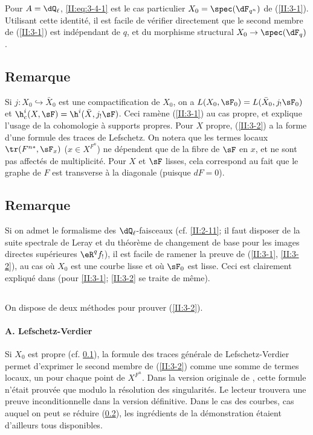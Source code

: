 Pour $A=\dQ_\ell$, \eqref{II:eq:3-4-1} est le cas particulier 
$X_0=\spec(\dF_{q^n})$ de (\ref{II:3-1}). Utilisant cette identité, il est 
facile de vérifier directement que le second membre de (\ref{II:3-1}) est 
indépendant de $q$, et du morphisme structural $X_0\to\spec(\dF_q)$. 





\subsection{Remarque}\label{II:3-6}

Si $j:X_0\hookrightarrow \bar X_0$ est une compactification de $X_0$, on a 
$L(X_0,\sF_0) = L(\bar X_0, j_!\sF_0)$ et 
$\h_c^i(X,\sF) = \h^i(\bar X,j_!\sF)$. Ceci ramène (\ref{II:3-1}) au cas 
propre, et explique l'usage de la cohomologie à supports propres. Pour $X$ 
propre, (\ref{II:3-2}) a la forme d'une formule des traces de Lefschetz. On 
notera que les termes locaux $\tr(F^{n *},\sF_x)$ ($x\in X^{F^n}$) ne 
dépendent que de la fibre de $\sF$ en $x$, et ne sont pas affectés de 
multiplicité. Pour $X$ et $\sF$ lisses, cela correspond au fait que le graphe 
de $F$ est transverse à la diagonale (puisque $d F = 0$). 





\subsection{Remarque}\label{II:3-7}

Si on admet le formalisme des $\dQ_\ell$-faisceaux (cf. \ref{II:2-11}; il faut 
disposer de la suite spectrale de Leray et du théorème de changement de 
base pour les images directes supérieures $\eR^q f_!$), il est facile de 
ramener la preuve de (\ref{II:3-1}, \ref{II:3-2}), au cas où $X_0$ est 
une courbe lisse et où $\sF_0$ est lisse. Ceci est clairement expliqué 
dans \cite[\S 5]{gr95} (pour \ref{II:3-1}; \ref{II:3-2} se traite de même). 





\subsection{}\label{II:3-8}

On dispose de deux méthodes pour prouver (\ref{II:3-2}). 


\paragraph{A. Lefschetz-Verdier}
Si $X_0$ est propre (cf. \ref{II:3-6}), la formule des traces générale de 
Lefschetz-Verdier permet d'exprimer le second membre de (\ref{II:3-2}) comme 
une somme de termes locaux, un pour chaque point de $X^{F^n}$. Dans la version 
originale de \cite{sga5}, cette formule n'était prouvée que modulo la 
résolution des singularités. Le lecteur trouvera une preuve inconditionnelle 
dans la version définitive. Dans le cas des courbes, cas auquel on peut se 
réduire (\ref{II:3-7}), les ingrédients de la démonstration étaient 
d'ailleurs tous disponibles. 

